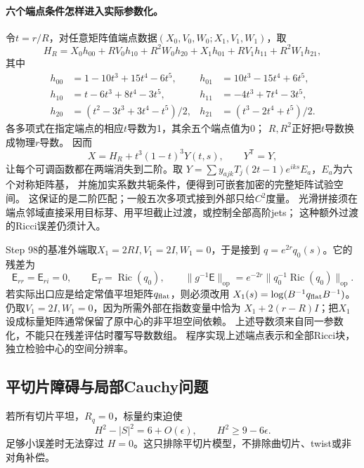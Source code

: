 \documentclass[UTF8,a4paper,11pt,fontset=fandol]{ctexart}
\numberwithin{equation}{section}
\theoremstyle{definition}
\newcommand{\Ric}{\operatorname{Ric}}
\newcommand{\op}{\mathrm{op}}
\begin{document}
\paragraph{六个端点条件怎样进入实际参数化。}
令$t=r/R$，对任意矩阵值端点数据$(X_0,V_0,W_0;X_1,V_1,W_1)$，取
\begin{equation}\label{eq:hermite-matrix}
 H_R=X_0h_{00}+RV_0h_{10}+R^2W_0h_{20}
       +X_1h_{01}+RV_1h_{11}+R^2W_1h_{21},
\end{equation}
其中
\begin{align*}
 h_{00}&=1-10t^3+15t^4-6t^5,&h_{01}&=10t^3-15t^4+6t^5,\\
 h_{10}&=t-6t^3+8t^4-3t^5,&h_{11}&=-4t^3+7t^4-3t^5,\\
 h_{20}&=(t^2-3t^3+3t^4-t^5)/2,&h_{21}&=(t^3-2t^4+t^5)/2.
\end{align*}
各多项式在指定端点的相应$t$导数为1，其余五个端点值为0；
$R,R^2$正好把$t$导数换成物理$r$导数。
因而
\begin{equation}\label{eq:hermite-free}
 X=H_R+t^3(1-t)^3Y(t,s),\qquad Y^{\mathsf T}=Y,
\end{equation}
让每个可调函数都在两端消失到二阶。取
$Y=\sum y_{ajk}T_j(2t-1)e^{iks}E_a$，$E_a$为六个对称矩阵基，
并施加实系数共轭条件，便得到可嵌套加密的完整矩阵试验空间。
这保证的是二阶匹配；一般五次多项式接到外部只给$C^2$度量。
光滑拼接须在端点邻域直接采用目标芽、用平坦截止过渡，或控制全部高阶jets；
这种额外过渡的Ricci误差仍须计入。

Step 98的基准外端取$X_1=2RI,V_1=2I,W_1=0$，于是接到
$q=e^{2r}q_0(s)$。它的残差为
\begin{equation}\label{eq:nonflat-exterior}
 \mathsf E_{rr}=\mathsf E_{ri}=0,\qquad
 \mathsf E_T=\Ric(q_0),\qquad
 \|g^{-1}\mathsf E\|_\op=e^{-2r}\|q_0^{-1}\Ric(q_0)\|_\op.
\end{equation}
若实际出口应是给定常值平坦矩阵$q_{\rm flat}$，则必须改用
$X_1(s)=\log(B^{-1}q_{\rm flat}B^{-1})$。
仍取$V_1=2I,W_1=0$，因为所需外部在指数变量中恰为
$X_1+2(r-R)I$；把$X_1$设成标量矩阵通常保留了原中心的非平坦空间依赖。
上述导数须来自同一参数化，不能只在残差评估时覆写导数数组。
程序实现上述端点表示和全部Ricci块，
独立检验中心的空间分辨率。

\subsection{平切片障碍与局部Cauchy问题}
若所有切片平坦，$R_q=0$，标量约束迫使
\[
H^2-|S|^2=6+O(\epsilon),\qquad
H^2\ge9-6\epsilon.
\]
足够小误差时无法穿过 $H=0$。这只排除平切片模型，不排除曲切片、twist或非对角补偿。
\end{document}
